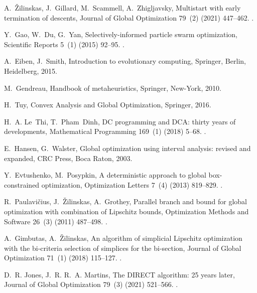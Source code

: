 \documentclass[review]{elsarticle}
\begin{document}
\begin{thebibliography}{10}
A.~{\v{Z}}ilinskas, J.~Gillard, M.~Scammell, A.~Zhigljavsky, Multistart with
  early termination of descents, Journal of Global Optimization 79~(2) (2021)
  447--462.
\newblock \href {https://doi.org/10.1007/s10898-019-00814-w}
  {}.

Y.~Gao, W.~Du, G.~Yan, Selectively-informed particle swarm optimization,
  Scientific Reports 5~(1) (2015) 92--95.
\newblock \href {https://doi.org/10.1038/srep09295}
  {}.

A.~Eiben, J.~Smith, Introduction to evolutionary computing, Springer, Berlin,
  Heidelberg, 2015.

M.~Gendreau, Handbook of metaheuristics, Springer, New-York, 2010.

H.~Tuy, Convex Analysis and Global Optimization, Springer, 2016.

H.~A. Le~Thi, T.~Pham Dinh, {DC} programming and {DCA}: thirty years of
  developments, Mathematical Programming 169~(1) (2018) 5--68.
\newblock \href {https://doi.org/10.1007/s10107-018-1235-y}
  {}.

E.~Hansen, G.~Walster, Global optimization using interval analysis: revised and
  expanded, CRC Press, Boca Raton, 2003.

Y.~Evtushenko, M.~Posypkin, A deterministic approach to global box-constrained
  optimization, Optimization Letters 7~(4) (2013) 819--829.
\newblock \href {https://doi.org/10.1007/s11590-012-0452-1}
  {}.

R.~Paulavi{\v{c}}ius, J.~{\v{Z}}ilinskas, A.~Grothey, Parallel branch and bound
  for global optimization with combination of {Lipschitz} bounds, Optimization
  Methods and Software 26~(3) (2011) 487--498.
\newblock \href {https://doi.org/10.1080/10556788.2010.551537}
  {}.

A.~Gimbutas, A.~{\v{Z}}ilinskas, An algorithm of simplicial {Lipschitz}
  optimization with the bi-criteria selection of simplices for the bi-section,
  Journal of Global Optimization 71~(1) (2018) 115--127.
\newblock \href {https://doi.org/10.1007/s10898-017-0550-9}
  {}.

D.~R. Jones, J.~R. R.~A. Martins, The {DIRECT} algorithm: 25 years later,
  Journal of Global Optimization 79~(3) (2021) 521--566.
\newblock \href {https://doi.org/10.1007/s10898-020-00952-6}
  {}.


\end{thebibliography}
\end{document}
